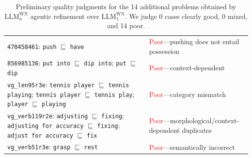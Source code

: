 \begin{table}[t]
\begin{tabularx}{\textwidth}{@{}p{}p{}@{}}
\texttt{470458461}: \texttt{push} $\sqsubseteq$ \texttt{have} & \textcolor{red}{Poor}---pushing does not entail possession \\
\texttt{856985136}: \texttt{put into} $\sqsubseteq$ \texttt{dip into}; \texttt{put} $\sqsubseteq$ \texttt{dip} & \textcolor{red}{Poor}---context-dependent \\
\texttt{vg\_len95r3e}: \texttt{tennis player} $\sqsubseteq$ \texttt{tennis playing}; \texttt{tennis player} $\sqsubseteq$ \texttt{tennis play}; \texttt{player} $\sqsubseteq$ \texttt{playing} & \textcolor{red}{Poor}---category mismatch \\
\texttt{vg\_verb119r2e}: \texttt{adjusting} $\sqsubseteq$ \texttt{fixing}; \texttt{adjusting for accuracy} $\sqsubseteq$ \texttt{fixing}; \texttt{adjust for accuracy} $\sqsubseteq$ \texttt{fix} & \textcolor{red}{Poor}---morphological/context-dependent duplicates \\
\texttt{vg\_verb51r3e}: \texttt{grasp} $\sqsubseteq$ \texttt{rest} & \textcolor{red}{Poor}---semantically incorrect \\
\bottomrule
\end{tabularx}
\caption{Preliminary quality judgments for the 14 additional problems obtained by $\mathrm{LLM}^{\mathrm{WN}}_{a}$ agentic refinement over $\mathrm{LLM}^{\mathrm{WN}}_{1}$. We judge 0 cases clearly good, 0 mixed, and 14 poor.}
\label{tab:gemini-agentic-quality-plus14}
\end{table}

